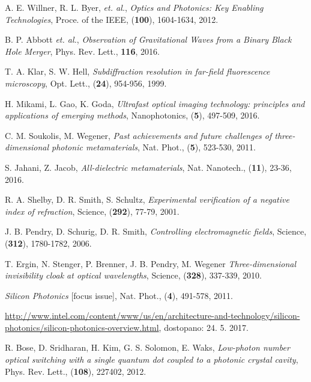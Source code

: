 \documentclass[longbibliography,slovene,a4paper,12pt]{book}
\begin{document}

\begin{thebibliography}{15}
	A. E. Willner, R. L. Byer, \emph{et. al.},
	\emph{Optics and Photonics: Key Enabling Technologies},
	Proce. of the IEEE, (\textbf{100}), 1604-1634, 2012.
	
	B. P. Abbott \emph{et. al.},
	\emph{Observation of Gravitational Waves from a Binary Black Hole Merger},
	Phys. Rev. Lett., \textbf{116}, 2016.
	
	T. A. Klar, S. W. Hell,
	\emph{Subdiffraction resolution in far-field fluorescence microscopy},
	Opt. Lett., (\textbf{24}), 954-956, 1999.
	
	H. Mikami, L. Gao, K. Goda,
	\emph{Ultrafast optical imaging technology: principles and applications of emerging methods},
	Nanophotonics, (\textbf{5}), 497-509, 2016.
	
	C. M. Soukolis, M. Wegener, 
	\emph{Past achievements and future challenges of three-dimensional photonic metamaterials},
	Nat. Phot., (\textbf{5}), 523-530, 2011.

	S. Jahani, Z. Jacob, 
	\emph{All-dielectric metamaterials},
	Nat. Nanotech., (\textbf{11}), 23-36, 2016.
	
	R. A. Shelby, D. R. Smith, S. Schultz,
	\emph{Experimental verification of a negative index of refraction},
	Science, (\textbf{292}), 77-79, 2001.

	J. B. Pendry, D. Schurig, D. R. Smith,
	\emph{Controlling electromagnetic fields},
	Science, (\textbf{312}), 1780-1782, 2006.

	T. Ergin, N. Stenger, P. Brenner, J. B. Pendry, M. Wegener
	\emph{Three-dimensional invisibility cloak at optical wavelengths},
	Science, (\textbf{328}), 337-339, 2010.

	\emph{Silicon Photonics} [focus issue],
	Nat. Phot., (\textbf{4}), 491-578, 2011.

	\url{http://www.intel.com/content/www/us/en/architecture-and-technology/silicon-photonics/silicon-photonics-overview.html}, dostopano: 24. 5. 2017.

	R. Bose, D. Sridharan, H. Kim, G. S. Solomon, E. Waks, 
	\emph{Low-photon number optical switching with a single quantum dot coupled to a photonic crystal cavity},
	Phys. Rev. Lett., (\textbf{108}), 227402, 2012.


\end{thebibliography}
\end{document}
